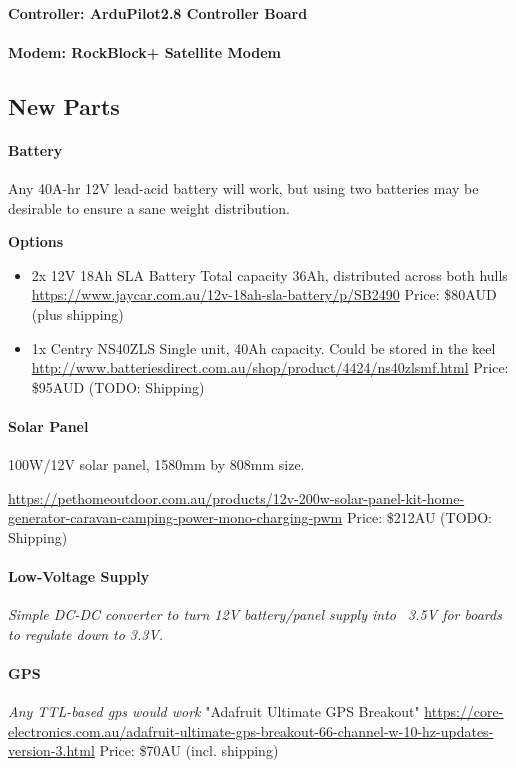\paragraph{Controller: ArduPilot2.8 Controller Board}

\paragraph{Modem: RockBlock+ Satellite Modem}

\subsection{New Parts}

\paragraph{Battery}
Any 40A-hr 12V lead-acid battery will work, but using two batteries may be desirable to ensure a sane weight distribution.

\textbf{Options}
\begin{itemize}
\item{2x 12V 18Ah SLA Battery} 
Total capacity 36Ah, distributed across both hulls
\url{https://www.jaycar.com.au/12v-18ah-sla-battery/p/SB2490}
Price: \$80AUD (plus shipping)

\item{1x Centry NS40ZLS}
Single unit, 40Ah capacity. Could be stored in the keel 
\url{http://www.batteriesdirect.com.au/shop/product/4424/ns40zlsmf.html}
Price: \$95AUD (TODO: Shipping)
\end{itemize}

\paragraph{Solar Panel}
100W/12V solar panel, 1580mm by 808mm size. 

\url{https://pethomeoutdoor.com.au/products/12v-200w-solar-panel-kit-home-generator-caravan-camping-power-mono-charging-pwm}
Price: \$212AU (TODO: Shipping)

\paragraph{Low-Voltage Supply}
\emph{Simple DC-DC converter to turn 12V battery/panel supply into ~3.5V for boards to regulate down to 3.3V.}

\paragraph{GPS}
\emph{Any TTL-based gps would work}
"Adafruit Ultimate GPS Breakout"
\url{https://core-electronics.com.au/adafruit-ultimate-gps-breakout-66-channel-w-10-hz-updates-version-3.html}
Price: \$70AU (incl. shipping)

